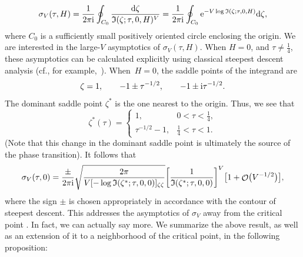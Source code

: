 \documentclass[10pt,a4paper]{amsart}
\DeclareMathOperator{\OO}{\mathcal{O}}
\numberwithin{equation}{section}
\begin{document}
 \begin{equation}\label{sigma-int}
 \sigma_V(\tau,H) = \frac{1}{2\pi {\rm i}}\oint_{C_0} \frac{{\rm d}\zeta}{\mathfrak{I}(\zeta;\tau,0,H)^V} = \frac{1}{2\pi {\rm i}}\oint_{C_0}{\rm e}^{-V\log\mathfrak{I}(\zeta;\tau,0,H)}{\rm d}\zeta,
 \end{equation}
where $C_0$ is a sufficiently small positively oriented circle enclosing the origin. We are interested in the large-$V$ asymptotics of
$\sigma_V(\tau,H)$. When $H=0$, and $\tau \neq \frac{1}{4}$, these asymptotics can be calculated explicitly using classical
steepest descent analysis (cf., for example,~\cite{Miller}). When~${H=0}$, the saddle points of the integrand are
 \begin{equation*}
 \zeta = 1,\qquad -1 \pm \tau^{-1/2},\qquad -1 \pm {\rm i}\tau^{-1/2}.
 \end{equation*}
The dominant saddle point $\zeta^*$ is the one nearest to the origin. Thus, we see that
 \begin{equation*}
 \zeta^*(\tau) =
 \begin{cases}
 1, & 0 < \tau < \frac{1}{4},\\
 \tau^{-1/2} - 1, & \frac{1}{4} < \tau < 1.
 \end{cases}
 \end{equation*}
(Note that this change in the dominant saddle point is ultimately the source of the phase transition). It follows that
 \begin{equation*}
 \sigma_V(\tau,0) = \frac{\pm}{2\pi {\rm i}}\sqrt{\frac{2\pi}{V[-\log\mathfrak{I}(\zeta^*;\tau,0,0)]_{\zeta\zeta}}}\biggl[\frac{1}{\mathfrak{I}(\zeta^*;\tau,0,0)}\biggr]^V\bigl[1 + \OO\bigl(V^{-1/2}\bigr)\bigr],
 \end{equation*}
where the sign $\pm$ is chosen appropriately in accordance with the contour of steepest descent. This addresses the asymptotics of
$\sigma_V$ away from the critical point . In fact, we can actually say more. We summarize the above result, as well as an extension of it to a neighborhood of the critical point, in the following proposition:
\end{document}
